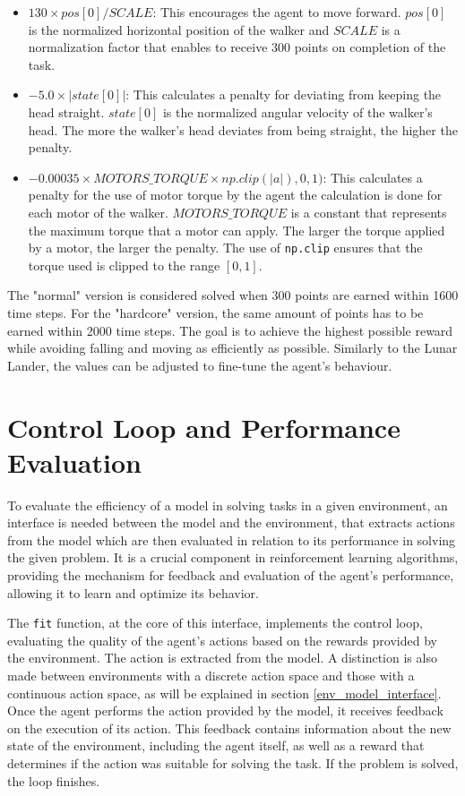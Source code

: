 \begin{itemize}
  \item $ 130 \times pos[0] / SCALE$: This encourages the agent to move forward. $pos[0]$ is the normalized horizontal position of the walker and $SCALE$ is a normalization factor that enables to receive 300 points on completion of the task.

  \item $-5.0 \times \lvert state[0] \rvert$: This calculates a penalty for deviating from keeping the head straight. $state[0]$ is the normalized angular velocity of the walker's head. The more the walker's head deviates from being straight, the higher the penalty.

  \item $-0.00035 \times MOTORS\_TORQUE \times np.clip(\lvert a \rvert), 0, 1)$: This calculates a penalty for the use of motor torque by the agent the calculation is done for each motor of the walker. $MOTORS\_TORQUE$ is a constant that represents the maximum torque that a motor can apply. The larger the torque applied by a motor, the larger the penalty. The use of \texttt{np.clip} ensures that the torque used is clipped to the range $[0, 1]$.

\end{itemize}

The "normal" version is considered solved when 300 points are earned within 1600 time steps. For the "hardcore" version, the same amount of points has to be earned within 2000 time steps. The goal is to achieve the highest possible reward while avoiding falling and moving as efficiently as possible. Similarly to the Lunar Lander, the values can be adjusted to fine-tune the agent's behaviour.

\section{Control Loop and Performance Evaluation}

To evaluate the efficiency of a model in solving tasks in a given environment, an interface is needed between the model and the environment, that extracts actions from the model which are then evaluated in relation to its performance in solving the given problem. It is a crucial component in reinforcement learning algorithms, providing the mechanism for feedback and evaluation of the agent's performance, allowing it to learn and optimize its behavior.

The \texttt{fit} function, at the core of this interface, implements the control loop, evaluating the quality of the agent's actions based on the rewards provided by the environment. The action is extracted from the model. A distinction is also made between environments with a discrete action space and those with a continuous action space, as will be explained in section \ref{env_model_interface}. Once the agent performs the action provided by the model, it receives feedback on the execution of its action. This feedback contains information about the new state of the environment, including the agent itself, as well as a reward that determines if the action was suitable for solving the task. If the problem is solved, the loop finishes.

